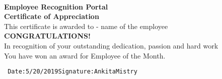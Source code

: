 \documentclass[a4paper]{article}
\begin{document}
    \pagestyle{empty}
    
    \begin{title} \\
    \begin{center}
    \textbf{{\normalsize \color{orange} Employee Recognition Portal}}\\
    \vspace{2em}
    \textbf{{\Large Certificate of Appreciation}}\\
    \vspace{2em}
    This certificate is awarded to - name of the employee\\
    \vspace{2em}
    \textbf{{\normalsize \color{red} CONGRATULATIONS!}}\\
    \color{black}In recognition of your outstanding dedication, passion and hard work\\
    You have won an award for \color{blue} Employee of the Month.\\
    
    
    
    
    \end{center}
    \vspace{38em}
    
    \texttt{\noindent
    Date:5/20/2019\hspace{35ex}Signature:AnkitaMistry}
    \end{title}
\end{document}
